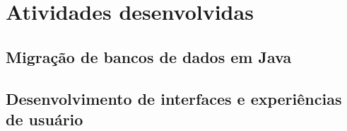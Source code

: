 \chapter{Atividades desenvolvidas}
\label{cap:atividades-desenvolvidas}

\section{Migração de bancos de dados em Java}
\label{sec:java-atividades}

\section{Desenvolvimento de interfaces e experiências de usuário}
\label{sec:ui-ux-atividades}
